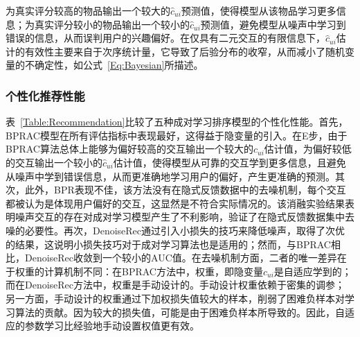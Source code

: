 为真实评分较高的物品输出一个较大的$\hat{c}_{ui}$预测值，使得模型从该物品学习更多信息；为真实评分较小的物品输出一个较小的$\hat{c}_{ui}$预测值，避免模型从噪声中学习到错误的信息，从而误判用户的兴趣偏好。在仅具有二元交互的有限信息下，$\hat{c}_{ui}$估计的有效性主要来自于次序统计量，它导致了后验分布的收窄，从而减小了随机变量的不确定性，如公式~\eqref{Eq:Bayesian}所描述。
\par 
\subsubsection{个性化推荐性能} 

表~\ref{Table:Recommendation}比较了五种成对学习排序模型的个性化性能。首先，BPRAC模型在所有评估指标中表现最好，这得益于隐变量的引入。在E步，由于BPRAC算法总体上能够为偏好较高的交互输出一个较大的$\hat{c}_{ui}$估计值，为偏好较低的交互输出一个较小的$\hat{c}_{ui}$估计值，使得模型从可靠的交互学到更多信息，且避免从噪声中学到错误信息，从而更准确地学习用户的偏好，产生更准确的预测。其次，此外，BPR表现不佳，该方法没有在隐式反馈数据中的去噪机制，每个交互都被认为是体现用户偏好的交互，这显然是不符合实际情况的。该消融实验结果表明噪声交互的存在对成对学习模型产生了不利影响，验证了在隐式反馈数据集中去噪的必要性。再次，DenoiseRec通过引入小损失的技巧来降低噪声，取得了次优的结果，这说明小损失技巧对于成对学习算法也是适用的；然而，与BPRAC相比，DenoiseRec收敛到一个较小的AUC值。在去噪机制方面，二者的唯一差异在于权重的计算机制不同：在BPRAC方法中，权重，即隐变量$\hat{c}_{ui}$是自适应学到的；而在DenoiseRec方法中，权重是手动设计的。手动设计权重依赖于密集的调参；另一方面，手动设计的权重通过下加权损失值较大的样本，削弱了困难负样本对学习算法的贡献。因为较大的损失值，可能是由于困难负样本所导致的。因此，自适应的参数学习比经验地手动设置权值更有效。

